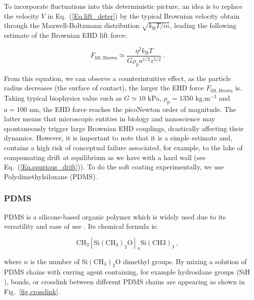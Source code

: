To incorporate fluctuations into this deterministic picture, an idea is to replace the velocity $V$ in Eq.~(\ref{Eq.lift_deter}) by the typical Brownian velocity obtain through the Maxwell-Boltzmann distribution $\sqrt{k_\mathrm{B}T / m}$, leading the following estimate of the Brownian \gls{EHD} lift force:

\begin{equation}
	F_\mathrm{lift, Brown} \simeq \frac{\eta ^2 k_\mathrm{B}T}{G\rho_\mathrm{p} a^{1/2} z^{5/2}} ~.
	\label{Eq.lift_brown}
\end{equation}


From this equation, we can observe a counterintuitive effect, as the particle radius decreases (the surface of contact), the larger the \gls{EHD} force $F_\mathrm{lift, Brown}$ is. Taking typical biophysics value such as $G \simeq 10$ kPa, $\rho_\mathrm{p} = 1350$ kg.m$^{-3}$ and $a=100$ nm, the \gls{EHD} force reaches the picoNewton order of magnitude. The latter means that microscopic entities in biology and nanoscience may spontaneously trigger large Brownian \gls{EHD} couplings, drastically affecting their dynamics. However, it is important to note that it is a simple estimate and, contains a high risk of conceptual failure associated, for example, to the lake of compensating drift at equilibrium as we have with a hard wall (see Eq.~(\ref{Eq.spurious_drift})). To do the soft coating experimentally, we use Polydimethylsiloxane (\gls{PDMS}).

\subsubsection{PDMS}

\gls{PDMS} is a silicone-based organic polymer which is widely used due to its versatility and ease of use \cite{wolf_pdms_2018}. Its chemical formula is:

\begin{equation}
	\mathrm{CH_3[Si(CH_3)_2 O]}_n \mathrm{Si(CH3)_3} ~,
\end{equation}

where $n$ is the number of $\mathrm{Si(CH_3)_2 O}$ dimethyl groups. By mixing a solution of \gls{PDMS} chains with curring agent containing, for example hydrosilane groups ($\mathrm{SiH}$), bonds, or crosslink between different \gls{PDMS} chains are appearing as shown in Fig.~\ref{fig.crosslink}.




